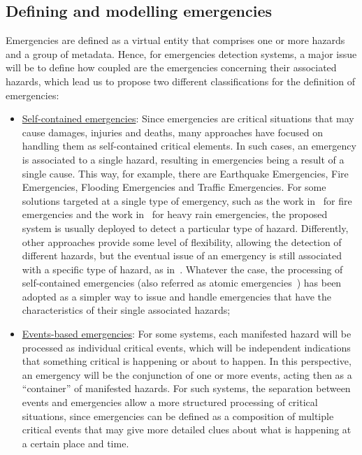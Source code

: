 \begin{refsection}
\subsection{Defining and modelling emergencies}

Emergencies are defined as a virtual entity that comprises one or more hazards and a group of metadata. Hence, for emergencies detection systems, a major issue will be to define how coupled are the emergencies concerning their associated hazards, which lead us to propose two different classifications for the definition of emergencies:

\begin{itemize}
  \item \underline{Self-contained emergencies}: Since emergencies are critical situations that may cause damages, injuries and deaths, many approaches have focused on handling them as self-contained critical elements. In such cases, an emergency is associated to a single hazard, resulting in emergencies being a result of a single cause. This way, for example, there are Earthquake Emergencies, Fire Emergencies, Flooding Emergencies and Traffic Emergencies. For some solutions targeted at a single type of emergency, such as the work in~\cite{iotFire1} for fire emergencies and the work in~\cite{iotRain1} for heavy rain emergencies, the proposed system is usually deployed to detect a particular type of hazard. Differently, other approaches provide some level of flexibility, allowing the detection of different hazards, but the eventual issue of an emergency is still associated with a specific type of hazard, as in~\cite{emergenciesmetric4}. Whatever the case, the processing of self-contained emergencies (also referred as atomic emergencies~\cite{emergenciesmetric6}) has been adopted as a simpler way to issue and handle emergencies that have the characteristics of their single associated hazards;
  
  \item \underline{Events-based emergencies}: For some systems, each manifested hazard will be processed as individual critical events, which will be independent indications that something critical is happening or about to happen. In this perspective, an emergency will be the conjunction of one or more events, acting then as a ``container'' of manifested hazards. For such systems, the separation between events and emergencies allow a more structured processing of critical situations, since emergencies can be defined as a composition of multiple critical events that may give more detailed clues about what is happening at a certain place and time.
\end{itemize}


\end{refsection}
